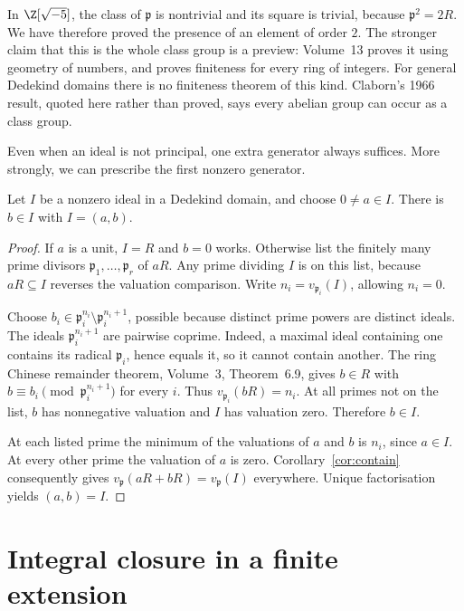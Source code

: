 In $\Z[\sqrt{-5}]$, the class of $\mathfrak p$ is nontrivial and its square is trivial, because $\mathfrak p^2=2R$. We have therefore proved the presence of an element of order $2$. The stronger claim that this is the whole class group is a preview: Volume~13 proves it using geometry of numbers, and proves finiteness for every ring of integers. For general Dedekind domains there is no finiteness theorem of this kind. Claborn's 1966 result, quoted here rather than proved, says every abelian group can occur as a class group.

Even when an ideal is not principal, one extra generator always suffices. More strongly, we can prescribe the first nonzero generator.

\begin{proposition}\label{prop:twogen}
Let $I$ be a nonzero ideal in a Dedekind domain, and choose $0\ne a\in I$. There is $b\in I$ with $I=(a,b)$.
\end{proposition}

\begin{proof}
If $a$ is a unit, $I=R$ and $b=0$ works. Otherwise list the finitely many prime divisors $\mathfrak p_1,\ldots,\mathfrak p_r$ of $aR$. Any prime dividing $I$ is on this list, because $aR\subseteq I$ reverses the valuation comparison. Write $n_i=v_{\mathfrak p_i}(I)$, allowing $n_i=0$.

Choose $b_i\in\mathfrak p_i^{n_i}\setminus\mathfrak p_i^{n_i+1}$, possible because distinct prime powers are distinct ideals. The ideals $\mathfrak p_i^{n_i+1}$ are pairwise coprime. Indeed, a maximal ideal containing one contains its radical $\mathfrak p_i$, hence equals it, so it cannot contain another. The ring Chinese remainder theorem, Volume~3, Theorem~6.9, gives $b\in R$ with $b\equiv b_i\pmod{\mathfrak p_i^{n_i+1}}$ for every $i$. Thus $v_{\mathfrak p_i}(bR)=n_i$. At all primes not on the list, $b$ has nonnegative valuation and $I$ has valuation zero. Therefore $b\in I$.

At each listed prime the minimum of the valuations of $a$ and $b$ is $n_i$, since $a\in I$. At every other prime the valuation of $a$ is zero. Corollary~\ref{cor:contain} consequently gives $v_{\mathfrak p}(aR+bR)=v_{\mathfrak p}(I)$ everywhere. Unique factorisation yields $(a,b)=I$.
\end{proof}

\section{Integral closure in a finite extension}

